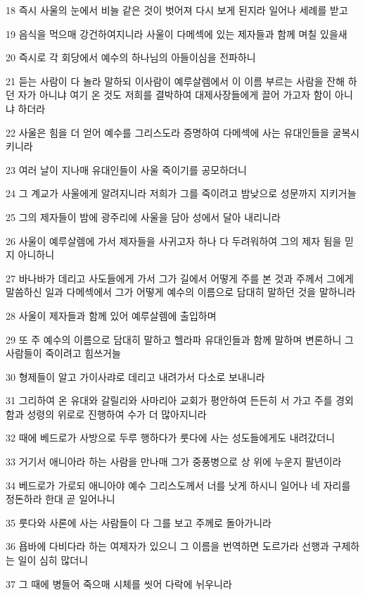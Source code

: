 \par 18 즉시 사울의 눈에서 비늘 같은 것이 벗어져 다시 보게 된지라 일어나 세례를 받고
\par 19 음식을 먹으매 강건하여지니라 사울이 다메섹에 있는 제자들과 함께 며칠 있을새
\par 20 즉시로 각 회당에서 예수의 하나님의 아들이심을 전파하니
\par 21 듣는 사람이 다 놀라 말하되 이사람이 예루살렘에서 이 이름 부르는 사람을 잔해 하던 자가 아니냐 여기 온 것도 저희를 결박하여 대제사장들에게 끌어 가고자 함이 아니냐 하더라
\par 22 사울은 힘을 더 얻어 예수를 그리스도라 증명하여 다메섹에 사는 유대인들을 굴복시키니라
\par 23 여러 날이 지나매 유대인들이 사울 죽이기를 공모하더니
\par 24 그 계교가 사울에게 알려지니라 저희가 그를 죽이려고 밤낮으로 성문까지 지키거늘
\par 25 그의 제자들이 밤에 광주리에 사울을 담아 성에서 달아 내리니라
\par 26 사울이 예루살렘에 가서 제자들을 사귀고자 하나 다 두려워하여 그의 제자 됨을 믿지 아니하니
\par 27 바나바가 데리고 사도들에게 가서 그가 길에서 어떻게 주를 본 것과 주께서 그에게 말씀하신 일과 다메섹에서 그가 어떻게 예수의 이름으로 담대히 말하던 것을 말하니라
\par 28 사울이 제자들과 함께 있어 예루살렘에 출입하며
\par 29 또 주 예수의 이름으로 담대히 말하고 헬라파 유대인들과 함께 말하며 변론하니 그 사람들이 죽이려고 힘쓰거늘
\par 30 형제들이 알고 가이사랴로 데리고 내려가서 다소로 보내니라
\par 31 그리하여 온 유대와 갈릴리와 사마리아 교회가 평안하여 든든히 서 가고 주를 경외함과 성령의 위로로 진행하여 수가 더 많아지니라
\par 32 때에 베드로가 사방으로 두루 행하다가 룻다에 사는 성도들에게도 내려갔더니
\par 33 거기서 애니아라 하는 사람을 만나매 그가 중풍병으로 상 위에 누운지 팔년이라
\par 34 베드로가 가로되 애니아야 예수 그리스도께서 너를 낫게 하시니 일어나 네 자리를 정돈하라 한대 곧 일어나니
\par 35 룻다와 사론에 사는 사람들이 다 그를 보고 주께로 돌아가니라
\par 36 욥바에 다비다라 하는 여제자가 있으니 그 이름을 번역하면 도르가라 선행과 구제하는 일이 심히 많더니
\par 37 그 때에 병들어 죽으매 시체를 씻어 다락에 뉘우니라
